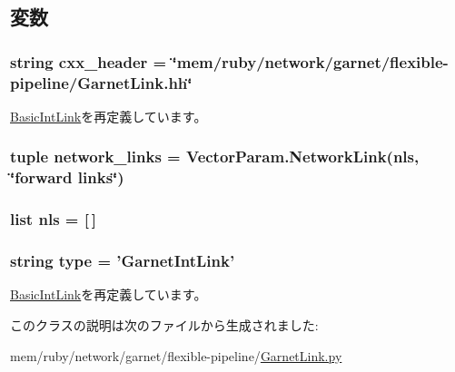 \subsection{変数}
\hypertarget{classGarnetLink_1_1GarnetIntLink_a17da7064bc5c518791f0c891eff05fda}{
\subsubsection[{cxx\_\-header}]{\setlength{\rightskip}{0pt plus 5cm}string {\bf cxx\_\-header} = \char`\"{}mem/ruby/network/garnet/flexible-\/pipeline/GarnetLink.hh\char`\"{}}}
\label{classGarnetLink_1_1GarnetIntLink_a17da7064bc5c518791f0c891eff05fda}


\hyperlink{classBasicLink_1_1BasicIntLink_a17da7064bc5c518791f0c891eff05fda}{BasicIntLink}を再定義しています。\hypertarget{classGarnetLink_1_1GarnetIntLink_a8bbf0848b3bec491562615b151d5c318}{
\subsubsection[{network\_\-links}]{\setlength{\rightskip}{0pt plus 5cm}tuple {\bf network\_\-links} = VectorParam.NetworkLink({\bf nls}, \char`\"{}forward links\char`\"{})}}
\label{classGarnetLink_1_1GarnetIntLink_a8bbf0848b3bec491562615b151d5c318}
\hypertarget{classGarnetLink_1_1GarnetIntLink_af11789bfc44615f3244deb3cf6054da9}{
\subsubsection[{nls}]{\setlength{\rightskip}{0pt plus 5cm}list {\bf nls} = \mbox{[}$\,$\mbox{]}}}
\label{classGarnetLink_1_1GarnetIntLink_af11789bfc44615f3244deb3cf6054da9}
\hypertarget{classGarnetLink_1_1GarnetIntLink_acce15679d830831b0bbe8ebc2a60b2ca}{
\subsubsection[{type}]{\setlength{\rightskip}{0pt plus 5cm}string {\bf type} = '{\bf GarnetIntLink}'}}
\label{classGarnetLink_1_1GarnetIntLink_acce15679d830831b0bbe8ebc2a60b2ca}


\hyperlink{classBasicLink_1_1BasicIntLink_acce15679d830831b0bbe8ebc2a60b2ca}{BasicIntLink}を再定義しています。

このクラスの説明は次のファイルから生成されました:\begin{DoxyCompactItemize}
\item 
mem/ruby/network/garnet/flexible-\/pipeline/\hyperlink{GarnetLink_8py}{GarnetLink.py}\end{DoxyCompactItemize}
